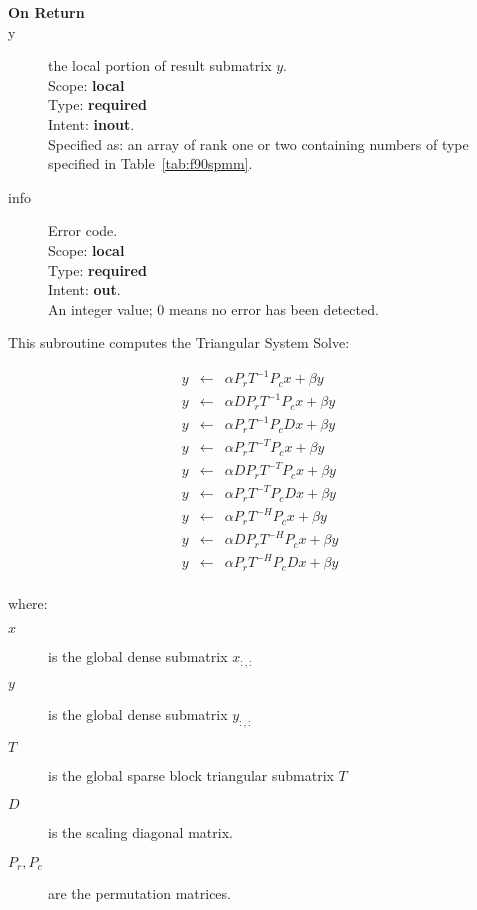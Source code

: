 \begin{description}
\item[\bf On Return]
\item[y] the local portion of result submatrix $y$.\\
Scope: {\bf local} \\
Type: {\bf required} \\
Intent: {\bf inout}.\\
Specified as: an array of rank one or two
containing numbers of type specified in
Table~\ref{tab:f90spmm}.
\item[info] Error code.\\
Scope: {\bf local} \\
Type: {\bf required} \\
Intent: {\bf out}.\\
An integer value; 0 means no error has been detected. 
\end{description}

%
%



This subroutine computes the Triangular System Solve:

\begin{eqnarray*}
y &\leftarrow& \alpha P_r T^{-1} P_c x + \beta y\\
y &\leftarrow& \alpha D P_r T^{-1} P_c x + \beta y\\
y &\leftarrow& \alpha P_r T^{-1} P_c D x + \beta y\\
y &\leftarrow& \alpha P_r T^{-T} P_c x + \beta y\\
y &\leftarrow& \alpha D P_r T^{-T} P_c x + \beta y\\
y &\leftarrow& \alpha P_r T^{-T} P_c D x + \beta y\\
y &\leftarrow& \alpha P_r T^{-H} P_c x + \beta y\\
y &\leftarrow& \alpha D P_r T^{-H} P_c x + \beta y\\
y &\leftarrow& \alpha P_r T^{-H} P_c D x + \beta y\\
\end{eqnarray*}


where:
\begin{description}
\item[$x$] is the global dense submatrix $x_{:, :}$
\item[$y$] is the global dense submatrix $y_{:, :}$
\item[$T$] is the global sparse block triangular submatrix $T$
\item[$D$] is the scaling diagonal matrix.
\item[$P_r, P_c$] are the permutation matrices.
\end{description}

